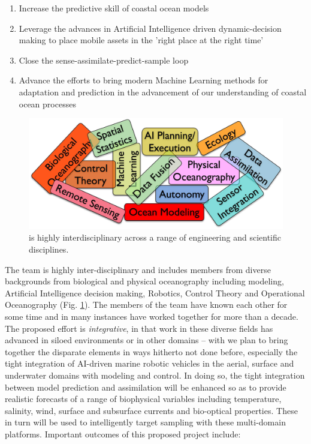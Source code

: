 \begin{enumerate}

\item Increase the predictive skill of coastal ocean models

\item Leverage the advances in Artificial Intelligence driven
  dynamic-decision making to place mobile assets in the 'right place
  at the right time'

\item Close the sense-assimilate-predict-sample loop
  
\item Advance the efforts to bring modern Machine Learning methods for
  adaptation and prediction in the advancement of our understanding of
  coastal ocean processes
  
\end{enumerate}

\begin{figure}
  \centering
  \includegraphics[scale=0.08]{fig/concepts.jpg}
  \caption{\proj is highly interdisciplinary across a range of
    engineering and scientific disciplines.}
  \label{fig:concepts}
\end{figure}

The \proj team is highly inter-disciplinary and includes members from
diverse backgrounds from biological and physical oceanography
including modeling, Artificial Intelligence decision making, Robotics,
Control Theory and Operational Oceanography
(Fig. \ref{fig:concepts}). The members of the team have known each
other for some time and in many instances have worked together for
more than a decade.  The proposed effort is \emph{integrative}, in
that work in these diverse fields has advanced in siloed environments
or in other domains -- with \proj we plan to bring together the
disparate elements in ways hitherto not done before, especially the
tight integration of AI-driven marine robotic vehicles in the aerial,
surface and underwater domains with modeling and control. In doing so,
the tight integration between model prediction and assimilation will
be enhanced so as to provide realistic forecasts of a range of
biophysical variables including temperature, salinity, wind, surface
and subsurface currents and bio-optical properties. These in turn will
be used to intelligently target sampling with these multi-domain
platforms. Important outcomes of this proposed project include:

